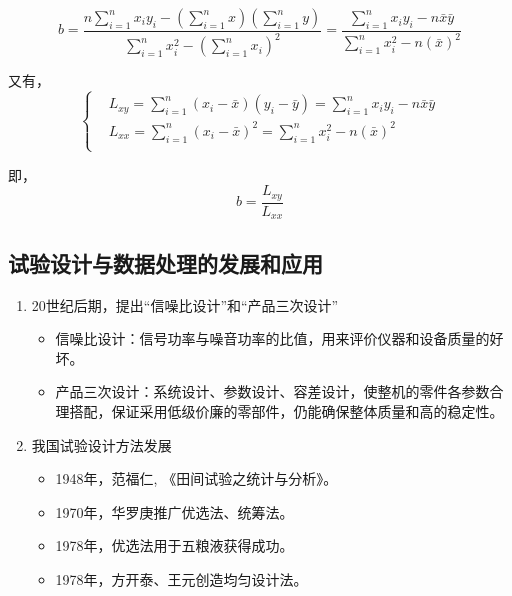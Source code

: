 \documentclass[UTF8]{ctexart}
\begin{document}
\begin{equation}
b=\frac{n\sum\limits_{i=1}^nx_{i}y_{i}-(\sum\limits_{i=1}^nx)(\sum\limits_{i=1}^ny)}
{\sum\limits_{i=1}^nx_{i}^{2}-(\sum\limits_{i=1}^nx_{i})^{2}}
=\frac{\sum\limits_{i=1}^nx_{i}y_{i}-n\bar{x}\bar{y}}{\sum\limits_{i=1}^nx_{i}^{2}-n(\bar{x})^2}
\end{equation}

\par 又有，
\begin{equation}
\left\{
\begin{aligned}
&L_{xy}=\sum\limits_{i=1}^n(x_{i}-\bar{x})(y_{i}-\bar{y})=\sum\limits_{i=1}^nx_{i}y_{i}-n\bar{x}\bar{y}\\
&L_{xx}=\sum\limits_{i=1}^n(x_{i}-\bar{x})^{2}={\sum\limits_{i=1}^nx_{i}^{2}-n(\bar{x})^2}\\
\end{aligned}
\right.
\end{equation}
\par 即，
\begin{equation}
b=\frac{L_{xy}}{L_{xx}}
\end{equation}

\subsection{试验设计与数据处理的发展和应用}
\begin{enumerate}[•]
\item 20世纪后期，提出“信噪比设计”和“产品三次设计”
\begin{itemize}
\item 信噪比设计：信号功率与噪音功率的比值，用来评价仪器和设备质量的好坏。
\item 产品三次设计：系统设计、参数设计、容差设计，使整机的零件各参数合理搭配，保证采用低级价廉的零部件，仍能确保整体质量和高的稳定性。
\end{itemize}
\item 我国试验设计方法发展
\begin{itemize}
\item 1948年，范福仁, 《田间试验之统计与分析》。
\item 1970年，华罗庚推广优选法、统筹法。
\item 1978年，优选法用于五粮液获得成功。
\item 1978年，方开泰、王元创造均匀设计法。
\end{itemize}
\end{enumerate}
\end{document}
